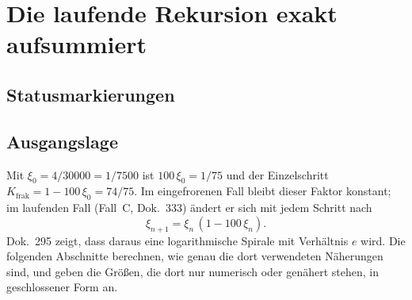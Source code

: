 
\providecommand{\BM}{\textbf{[B]}}
\providecommand{\KM}{\textbf{[K]}}
\providecommand{\SM}{\textbf{[S]}}

\chapter*{Die laufende Rekursion exakt aufsummiert}

\begin{abstract}
Die Rekursion $\xi_{n+1}=\xi_n(1-100\,\xi_n)$ (Dok.~295, 333) ist die Buchhaltung
der fraktalen Korrektur im laufenden Fall. Dok.~295 leitet ihren Kontinuumsverlauf
$\xi_n\approx1/(100(n+75))$ und den logarithmischen Defekt $D(n)\approx\ln(1+n/75)$
her. Dieses Dokument ergänzt vier Aussagen. Erstens teleskopiert das Produkt aller
Korrekturfaktoren exakt zu $\xi_n/\xi_0$ \BM. Zweitens verbessert ein logarithmischer
Term zweiter Ordnung die Kontinuumsnäherung um den Faktor 50 bis etwa 1000 \KM. Drittens
sind multiplikative und additive Buchhaltung um einen festen Betrag $\psi'(75)/2$
verschieden, und die in Dok.~295 numerisch gefundene beschränkte Konstante
$\approx0{,}0134$ zwischen Masse- und Zeitdefekt ist $\psi'(75)=\sum_{k\ge0}(k+75)^{-2}$
\KM. Viertens hat die Rekursion die Form eines Ein-Schleifen-Laufs, dessen
Koeffizient allerdings erst mit einer Schrittkonvention festliegt \SM.
\end{abstract}

\section*{Statusmarkierungen}


\section{Ausgangslage}

Mit $\xi_0=4/30000=1/7500$ ist $100\,\xi_0=1/75$ und der Einzelschritt
$K_\text{frak}=1-100\,\xi_0=74/75$. Im eingefrorenen Fall bleibt dieser Faktor
konstant; im laufenden Fall (Fall~C, Dok.~333) ändert er sich mit jedem Schritt
nach
\begin{equation}
  \xi_{n+1}=\xi_n\,(1-100\,\xi_n). \label{eq:rek}
\end{equation}
Dok.~295 zeigt, dass daraus eine logarithmische Spirale mit Verhältnis $e$ wird.
Die folgenden Abschnitte berechnen, wie genau die dort verwendeten Näherungen
sind, und geben die Größen, die dort nur numerisch oder genähert stehen, in
geschlossener Form an.

